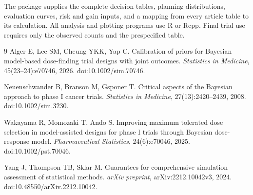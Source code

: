 \documentclass[letterpaper,12pt]{article}
\begin{document}
The package supplies the complete decision tables, planning
distributions, evaluation curves, risk and gain inputs, and a mapping
from every article table to its calculation. All analysis and plotting
programs use R or Rcpp. Final trial use requires only the observed
counts and the prespecified table.

\begin{thebibliography}{9}
Alger E, Lee SM, Cheung YKK, Yap C.
Calibration of priors for Bayesian model-based dose-finding trial
designs with joint outcomes. \emph{Statistics in Medicine},
45(23--24):e70746, 2026. doi:10.1002/sim.70746.

Neuenschwander B, Branson M, Gsponer T.
Critical aspects of the Bayesian approach to phase I cancer trials.
\emph{Statistics in Medicine}, 27(13):2420--2439, 2008.
doi:10.1002/sim.3230.

Wakayama R, Momozaki T, Ando S.
Improving maximum tolerated dose selection in model-assisted designs
for phase I trials through Bayesian dose-response model.
\emph{Pharmaceutical Statistics}, 24(6):e70046, 2025.
doi:10.1002/pst.70046.

Yang J, Thompson TB, Sklar M.
Guarantees for comprehensive simulation assessment of statistical
methods. \emph{arXiv preprint}, arXiv:2212.10042v3, 2024.
doi:10.48550/arXiv.2212.10042.
\end{thebibliography}
\end{document}
